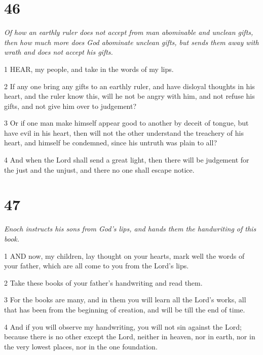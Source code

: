 \chapter{46}

\par \textit{Of how an earthly ruler does not accept from man abominable and unclean gifts, then how much more does God abominate unclean gifts, but sends them away with wrath and does not accept his gifts.}

\par 1 HEAR, my people, and take in the words of my lips.

\par 2 If any one bring any gifts to an earthly ruler, and have disloyal thoughts in his heart, and the ruler know this, will he not be angry with him, and not refuse his gifts, and not give him over to judgement?

\par 3 Or if one man make himself appear good to another by deceit of tongue, but have evil in his heart, then will not the other understand the treachery of his heart, and himself be condemned, since his untruth was plain to all?

\par 4 And when the Lord shall send a great light, then there will be judgement for the just and the unjust, and there no one shall escape notice.

\chapter{47}

\par \textit{Enoch instructs his sons from God's lips, and hands them the handwriting of this book.}

\par 1 AND now, my children, lay thought on your hearts, mark well the words of your father, which are all come to you from the Lord's lips.

\par 2 Take these books of your father's handwriting and read them.

\par 3 For the books are many, and in them you will learn all the Lord's works, all that has been from the beginning of creation, and will be till the end of time.

\par 4 And if you will observe my handwriting, you will not sin against the Lord; because there is no other except the Lord, neither in heaven, nor in earth, nor in the very lowest places, nor in the one foundation.

